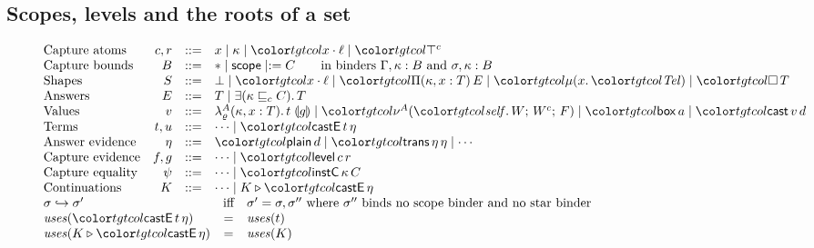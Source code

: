 \subsection{Scopes, levels and the roots of a set}\label{sec:levels-scopes}

\begin{figure}[t]
\footnotesize
\color{tgtcol}
\[
\begin{array}{@{}l@{}}
\begin{array}{@{}l@{\quad}rcl@{}}
\text{Capture atoms} & c, r & ::= & x \mid \kappa \mid \sel{x}{\ell} \mid \topc \\
\text{Capture bounds} & B & ::= & \cstar \mid \scopeb \mid \instb{C} \qquad \text{in binders } \Gamma, \kappa : B \text{ and } \sigma, \kappa : B \\
\text{Shapes} & S & ::= & \bot \mid \sel{x}{\ell} \mid \pit[\kappa, x]{T}{E} \mid \obj[x]{\tel} \mid \boxt{T} \\
\text{Answers} & E & ::= & T \mid \exc{\kappa}{C}{T} \\
\text{Values} & v & ::= & \lamcc{A}{\varrho}{\kappa, x}{T}{t}{g} \mid \litc{A}{W}{W^{c}}{F} \mid \ev{box}\,a \mid \ev{cast}\,v\,d \\
\text{Terms} & t, u & ::= & \cdots \mid \ev{castE}\,t\,\eta \\
\text{Answer evidence} & \eta & ::= & \ev{plain}\,d \mid \ev{trans}\,\eta\,\eta \mid \cdots \\
\text{Capture evidence} & f, g & ::= & \cdots \mid \ev{level}\,c\,r \\
\text{Capture equality} & \psi & ::= & \cdots \mid \ev{instC}\,\kappa\,C \\
\text{Continuations} & K & ::= & \cdots \mid K \triangleright \ev{castE}\,\eta
\end{array} \\[6pt]
\begin{array}{@{}lcl@{}}
\sext{\sigma}{\sigma'} & \text{iff} & \sigma' = \sigma, \sigma'' \text{ where } \sigma'' \text{ binds no scope binder and no star binder} \\
\uses{\ev{castE}\,t\,\eta} & = & \uses{t} \\
\uses{K \triangleright \ev{castE}\,\eta} & = & \uses{K}
\end{array}
\end{array}
\]
\begin{mathpar}

\end{mathpar}
\end{figure}
